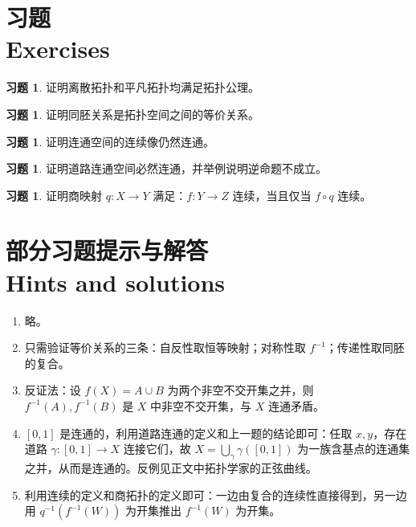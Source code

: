 \documentclass[12pt,a4paper,UTF8]{ctexart}
\theoremstyle{definition}
\newtheorem{exercise}[theorem]{习题}
\begin{document}
\section{习题\\
Exercises}

\begin{exercise}
证明离散拓扑和平凡拓扑均满足拓扑公理。
\end{exercise}

\begin{exercise}
证明同胚关系是拓扑空间之间的等价关系。
\end{exercise}

\begin{exercise}
证明连通空间的连续像仍然连通。
\end{exercise}

\begin{exercise}
证明道路连通空间必然连通，并举例说明逆命题不成立。
\end{exercise}

\begin{exercise}
证明商映射 $q:X\to Y$ 满足：$f:Y\to Z$ 连续，当且仅当 $f\circ q$ 连续。
\end{exercise}

\section{部分习题提示与解答\\
Hints and solutions}

\begin{enumerate}[label=\textbf{\arabic*.},itemsep=4pt]
\item 略。
\item 只需验证等价关系的三条：自反性取恒等映射；对称性取 $f^{-1}$；传递性取同胚的复合。
\item 反证法：设 $f(X)=A\cup B$ 为两个非空不交开集之并，则 $f^{-1}(A),f^{-1}(B)$ 是 $X$ 中非空不交开集，与 $X$ 连通矛盾。
\item $[0,1]$ 是连通的，利用道路连通的定义和上一题的结论即可：任取 $x,y$，存在道路 $\gamma:[0,1]\to X$ 连接它们，故 $X=\bigcup_{\gamma}\gamma([0,1])$ 为一族含基点的连通集之并，从而是连通的。反例见正文中拓扑学家的正弦曲线。
\item 利用连续的定义和商拓扑的定义即可：一边由复合的连续性直接得到，另一边用 $q^{-1}(f^{-1}(W))$ 为开集推出 $f^{-1}(W)$ 为开集。
\end{enumerate}
\end{document}
